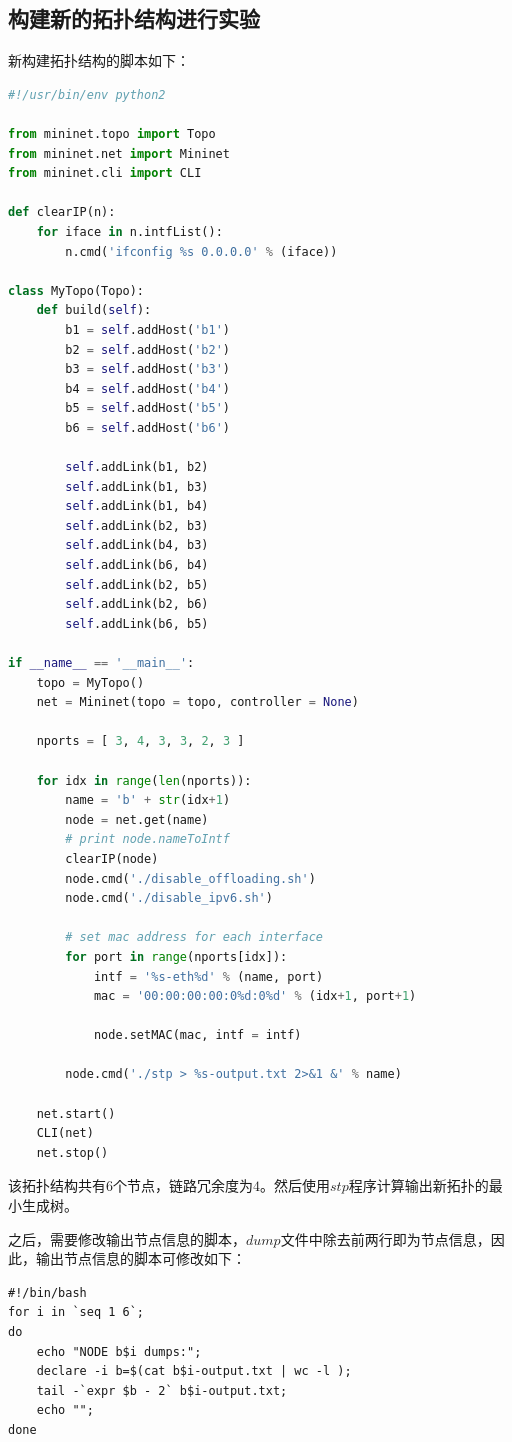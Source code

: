 \documentclass[UTF8,noindent]{ctexart}
\begin{document}
\subsection*{构建新的拓扑结构进行实验}
新构建拓扑结构的脚本如下：
\begin{lstlisting}[language=Python]
#!/usr/bin/env python2

from mininet.topo import Topo
from mininet.net import Mininet
from mininet.cli import CLI

def clearIP(n):
    for iface in n.intfList():
        n.cmd('ifconfig %s 0.0.0.0' % (iface))

class MyTopo(Topo):
    def build(self):
        b1 = self.addHost('b1')
        b2 = self.addHost('b2')
        b3 = self.addHost('b3')
        b4 = self.addHost('b4')
        b5 = self.addHost('b5')
        b6 = self.addHost('b6')

        self.addLink(b1, b2)
        self.addLink(b1, b3)
        self.addLink(b1, b4)
        self.addLink(b2, b3)
        self.addLink(b4, b3)
        self.addLink(b6, b4)
        self.addLink(b2, b5)
        self.addLink(b2, b6)
        self.addLink(b6, b5)

if __name__ == '__main__':
    topo = MyTopo()
    net = Mininet(topo = topo, controller = None)

    nports = [ 3, 4, 3, 3, 2, 3 ]

    for idx in range(len(nports)):
        name = 'b' + str(idx+1)
        node = net.get(name)
        # print node.nameToIntf
        clearIP(node)
        node.cmd('./disable_offloading.sh')
        node.cmd('./disable_ipv6.sh')

        # set mac address for each interface
        for port in range(nports[idx]):
            intf = '%s-eth%d' % (name, port)
            mac = '00:00:00:00:0%d:0%d' % (idx+1, port+1)

            node.setMAC(mac, intf = intf)

        node.cmd('./stp > %s-output.txt 2>&1 &' % name)

    net.start()
    CLI(net)
    net.stop()
\end{lstlisting}
该拓扑结构共有$6$个节点，链路冗余度为$4$。然后使用$stp$程序计算输出新拓扑的最小生成树。

之后，需要修改输出节点信息的脚本，$dump$文件中除去前两行即为节点信息，因此，输出节点信息的脚本可修改如下：
\begin{lstlisting}
#!/bin/bash
for i in `seq 1 6`;
do
    echo "NODE b$i dumps:";
    declare -i b=$(cat b$i-output.txt | wc -l );
    tail -`expr $b - 2` b$i-output.txt;
    echo "";
done
\end{lstlisting}
\end{document}
